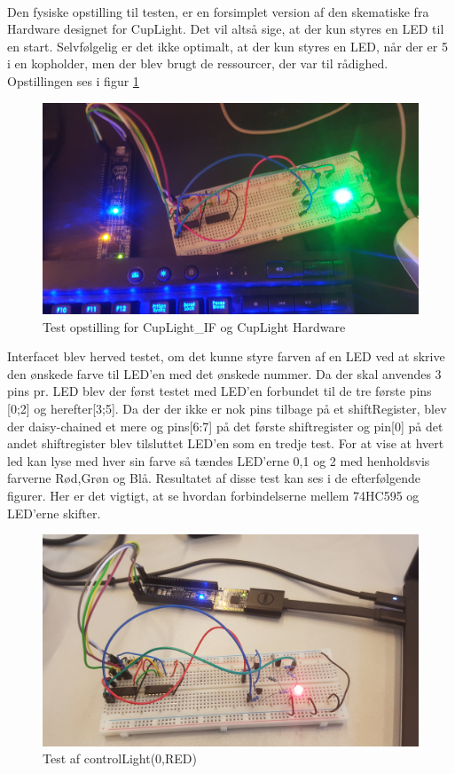 \documentclass[Modultest/Modultest_main.tex]{subfiles}
\begin{document}
\\Den fysiske opstilling til testen, er en forsimplet version af den skematiske fra Hardware designet for CupLight. Det vil altså sige, at der kun styres en LED til en start. Selvfølgelig er det ikke optimalt, at der kun styres en LED, når der er 5 i en kopholder, men der blev brugt de ressourcer, der var til rådighed. Opstillingen ses i figur \ref{fig:cupLight_test}

\begin{figure}[H]
    \centering
    \includegraphics[width=\textwidth]{Modultest/CupLight/graphics/CupLight_IF_TEST.jpg}
    \caption{Test opstilling for CupLight\_IF og CupLight Hardware}
    \label{fig:cupLight_test}
\end{figure}

Interfacet blev herved testet, om det kunne styre farven af en LED ved at skrive den ønskede farve til LED'en med det ønskede nummer. Da der skal anvendes 3 pins pr. LED blev der først testet med LED'en forbundet til de tre første pins [0;2] og herefter[3;5]. Da der der ikke er nok pins tilbage på et shiftRegister, blev der daisy-chained et mere og pins[6:7] på det første shiftregister og pin[0] på det andet shiftregister blev tilsluttet LED'en som en tredje test. For at vise at hvert led kan lyse med hver sin farve så tændes LED'erne 0,1 og 2 med henholdsvis farverne Rød,Grøn og Blå. Resultatet af disse test kan ses i de efterfølgende figurer. Her er det vigtigt, at se hvordan forbindelserne mellem 74HC595 og LED'erne skifter.

\begin{figure}[H]
    \centering
    \includegraphics[width=\textwidth]{Modultest/CupLight/graphics/interface_test1.jpg}
    \caption{Test af controlLight(0,RED)}
    \label{fig:cuplight_red_test1}
\end{figure}
\end{document}
